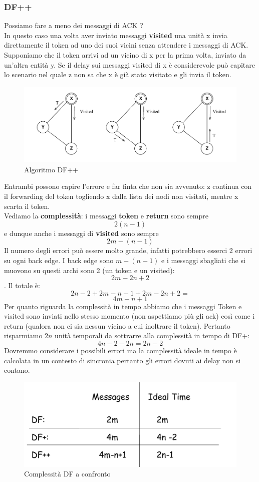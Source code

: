 \documentclass[12pt]{article}
\begin{document}
		\subsubsection{DF++}
			Possiamo fare a meno dei messaggi di ACK ?\\
			In questo caso una volta aver inviato messaggi \textbf{visited} una unità x invia direttamente il token ad uno dei suoi vicini senza attendere i messaggi di ACK. Supponiamo che il token arrivi ad un vicino di x per la prima volta, inviato da un'altra entità y. Se il delay sui messaggi visited di x è considerevole può capitare lo scenario nel quale z non sa che x è già stato visitato e gli invia il token.
			\begin{figure}[h!]
				\centering
				\includegraphics[scale=0.3]{img/df++.png}
				\caption{Algoritmo DF++}
			\end{figure}
			Entrambi possono capire l'errore e far finta che non sia avvenuto: z continua con il forwarding del token togliendo x dalla lista dei nodi non visitati, mentre x scarta il token.\\
			Vediamo la \textbf{complessità}: i messaggi \textbf{token }e \textbf{return }sono sempre $$2(n-1)$$ e dunque anche i messaggi di \textbf{visited} sono sempre $$2m-(n-1) $$ Il numero degli errori può essere molto grande, infatti potrebbero esserci 2 errori su ogni back edge. I back edge sono $m-(n-1) $ e i messaggi sbagliati che si muovono su questi archi sono 2 (un token e un visited): $$2m-2n+2 $$. Il totale è:
			$$2n-2+2m-n+1+2m-2n+2 =  $$
			$$4m-n+1 $$ 
			Per quanto riguarda la complessità in tempo abbiamo che i messaggi Token e visited sono inviati nello stesso momento (non aspettiamo più gli ack) così come i return (qualora non ci sia nessun vicino a cui inoltrare il token). Pertanto risparmiamo $2n $ unità temporali da sottrarre alla complessità in tempo di DF+:
			$$4n-2-2n = 2n-2 $$
			Dovremmo considerare i possibili errori ma la complessità ideale in tempo è calcolata in un contesto di sincronia pertanto gli errori dovuti ai delay non si contano.
			\begin{figure}[h!]
				\centering
				\includegraphics[scale=0.3]{img/conf.png}
				\caption{Complessità DF a confronto}
			\end{figure}
\end{document}
